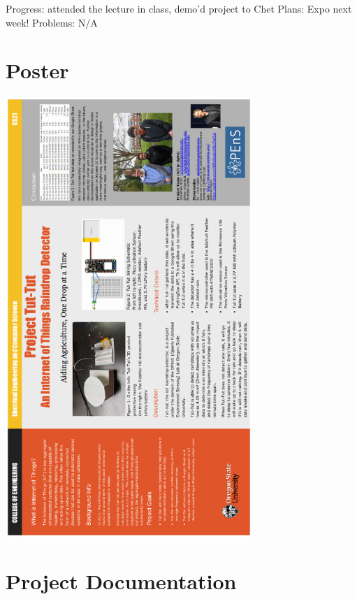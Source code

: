 \documentclass[letterpaper,10pt,draftclsnofoot,onecolumn]{article}
\begin{document}
Progress: attended the lecture in class, demo'd project to Chet
\newline
Plans: Expo next week!
\newline
Problems: N/A
\newline

\section{Poster}
\includegraphics[width=0.7\textwidth]{TutTut_Poster.eps}

\section{Project Documentation}
\end{document}
